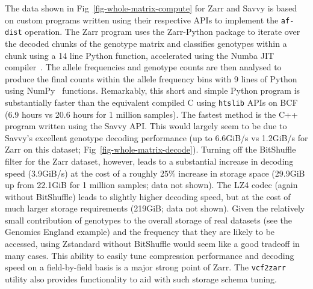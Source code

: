\documentclass[a4paper,num-refs]{oup-contemporary}
\begin{document}
The data shown in Fig~\ref{fig-whole-matrix-compute} for Zarr and Savvy
is based on custom programs written using their respective APIs
to implement the \texttt{af-dist} operation. The Zarr program uses
the Zarr-Python package to iterate over the decoded chunks of the 
genotype matrix and classifies genotypes within a chunk using a 14 line Python
function, accelerated using the Numba JIT compiler~\cite{lam2015numba}.
The allele frequencies and genotype counts are then analysed to produce 
the final counts within the allele frequency bins with 9 lines of 
Python using NumPy~\cite{harris2020array} functions. Remarkably, this 
short and simple Python program is substantially faster than the 
equivalent compiled C using \texttt{htslib} APIs on BCF (6.9 hours
vs 20.6 hours for 1 million samples). 
The fastest method is the 
C++ program written using the Savvy API. This would largely seem
to be due to Savvy's excellent genotype decoding performance
(up to 6.6GiB/s vs 1.2GiB/s for Zarr on this dataset;
Fig~\ref{fig-whole-matrix-decode}).
Turning off the BitShuffle filter for the Zarr dataset,
however, leads to a substantial increase in decoding speed
(3.9GiB/s) at the cost of a roughly 25\% increase in storage
space (29.9GiB up from 22.1GiB for 1 million samples; data not
shown). The LZ4 codec (again without BitShuffle) leads to slightly higher
decoding speed, but at the cost of much larger storage requirements 
(219GiB; data not shown).
Given the relatively small contribution of genotypes to the
overall storage of real datasets (see the Genomics England example)
and the frequency that they are likely to be accessed, using 
Zstandard without BitShuffle 
would seem like a good tradeoff in many cases.
This ability to easily tune compression performance
and decoding speed on a field-by-field basis is a major strong
point of Zarr. The \texttt{vcf2zarr} utility also provides
functionality to aid with such storage schema tuning.
\end{document}
